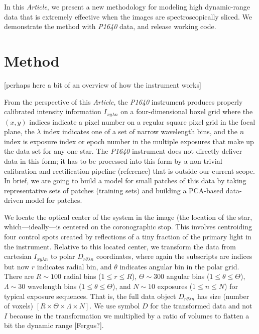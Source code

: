 \documentclass[12pt,pdftex,preprint]{aastex}
\newcommand{\documentname}{\textsl{Article}}
\newcommand{\project}[1]{\textsl{#1}}
\begin{document}
In this \documentname, we present a new methodology for modeling high
dynamic-range data that is extremely effective when the images are
spectroscopically sliced.  We demonstrate the method with \project{P1640} data,
and release working code.

\section{Method}

[perhaps here a bit of an overview of how the instrument works]

From the perspective of this \documentname, the \project{P1640}
instrument produces properly calibrated intensity information $I_{x y
  \lambda n}$ on a four-dimensional boxel grid where the $(x, y)$
indices indicate a pixel number on a regular square pixel grid in the
focal plane, the $\lambda$ index indicates one of a set of narrow
wavelength bins, and the $n$ index is exposure index or epoch number
in the multiple exposures that make up the data set for any one star.
The \project{P1640} instrument does not directly deliver data in this
form; it has to be processed into this form by a non-trivial
calibration and rectification pipeline (reference) that is outside our
current scope.  In brief, we are going to build a model for small
patches of this data by taking representative sets of patches
(training sets) and building a PCA-based data-driven model for
patches.

We locate the optical center of the system in the image (the location
of the star, which---ideally---is centered on the coronographic stop.
This involves centroiding four control spots created by reflections of
a tiny fraction of the primary light in the instrument.  Relative to
this located center, we transform the data from cartesian $I_{x y
  \lambda n}$ to polar $D_{r \theta \lambda n}$ coordinates, where
again the subscripts are indices but now $r$ indicates radial bin, and
$\theta$ indicates angular bin in the polar grid.  There are $R\sim
100$ radial bins ($1\leq r\leq R$), $\Theta\sim 300$ angular bins
($1\leq\theta\leq\Theta$), $\Lambda\sim 30$ wavelength bins
($1\leq\theta\leq\Theta$), and $N\sim 10$ exposures ($1\leq
n\leq N$) for typical exposure sequences.  That is, the full data
object $D_{r \theta \lambda n}$ has size (number of voxels)
$[R\times\Theta\times\Lambda\times N]$.  We use symbol $D$ for the
transformed data and not $I$ because in the transformation we
multiplied by a ratio of volumes to flatten a bit the dynamic range
[Fergus?].
\end{document}
